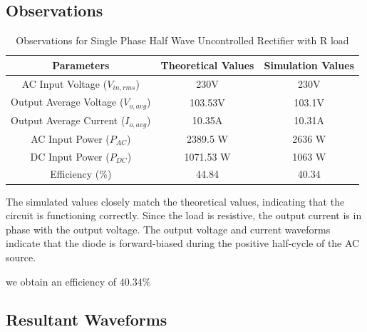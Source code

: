 \subsection{Observations}

\begin{table}[h]
    \renewcommand{\arraystretch}{1.3}
    \label{table_observation_single-phase-half-wave-uncontrolled-rectifier-with-R-load}
    \centering
    \begin{tabular}{|c|c|c|}
        \hline
        Parameters                              & Theoretical Values & Simulation Values \\
        \hline
        \hline
        AC Input Voltage ($ V_{in,rms} $)       & 230V               & 230V              \\
        \hline
        Output Average Voltage ($ V_{o,avg} $)  & 103.53V            & 103.1V            \\
        \hline
        Output Average Current ($ I_{o,avg}  $) & 10.35A             & 10.31A            \\
        \hline
        AC Input Power ($ P_{AC}  $)            & 2389.5 W           & 2636 W            \\
        \hline
        DC Input Power ($ P_{DC}  $)            & 1071.53 W          & 1063 W            \\
        \hline
        Efficiency (\%)                         & 44.84              & 40.34             \\
        \hline
    \end{tabular}
    \caption{Observations for Single Phase Half Wave Uncontrolled Rectifier with R load}

\end{table}


The simulated values closely match the theoretical values, indicating that the circuit is functioning correctly. Since the load is resistive, the output current is in phase with the output voltage. The output voltage and current waveforms indicate that the diode is forward-biased during the positive half-cycle of the AC source.

we obtain an efficiency of 40.34\%
\pagebreak

\subsection{Resultant Waveforms}

